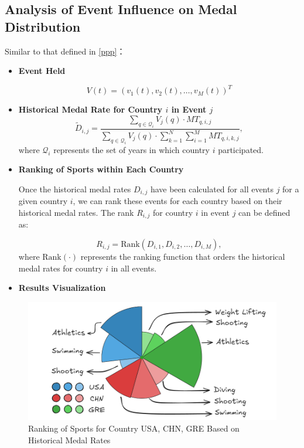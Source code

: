 \documentclass{mcmthesis}
\begin{document}
\subsection{Analysis of Event Influence on Medal Distribution}
Similar to that defined in \ref{ppp}：
\begin{itemize}[leftmargin=0.15in, labelsep=0.1in, itemsep=1pt, parsep=0pt]
	\item \textbf{Event Held}
	
	\[
	V(t) = \left( v_1(t), v_2(t), \dots, v_M(t) \right)^T
	\]
	

	
	\item \textbf{Historical Medal Rate for Country \( i \) in Event \( j \)}
	\[
	\tilde{D}_{i,j} = \frac{\sum_{q \in \mathcal{Q}_i} V_j(q) \cdot MT_{q,i,j}}{\sum_{q \in \mathcal{Q}_i} V_j(q) \cdot \sum_{k=1}^{N} \sum_{i=1}^{M} MT_{q,i,k,j}},
	\]
	where \( \mathcal{Q}_i \) represents the set of years in which country \( i \) participated.


	
	\item \textbf{Ranking of Sports within Each Country}
	
	Once the historical medal rates \( D_{i,j} \) have been calculated for all events \( j \) for a given country \( i \), we can rank these events for each country based on their historical medal rates. The rank \( R_{i,j} \) for country \( i \) in event \( j \) can be defined as:
	
	\[
	R_{i,j} = \text{Rank}(D_{i,1}, D_{i,2}, \dots, D_{i,M}),
	\]
	where \( \text{Rank}(\cdot) \) represents the ranking function that orders the historical medal rates for country \( i \) in all events.
	
	\item \textbf{Results Visualization}
	

\end{itemize}
	\begin{figure}[htbp]
		\centering
		\includegraphics[width=1\textwidth]{fig/Rose-Chart.png}
		\caption{Ranking of Sports for Country USA, CHN, GRE Based on Historical Medal Rates}
		\label{fig:ranking}
	\end{figure}
\end{document}
